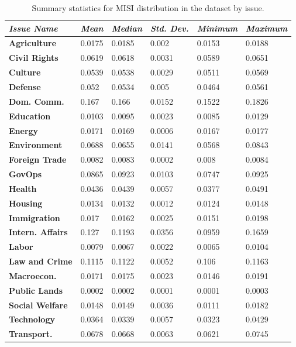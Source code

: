 \documentclass[11pt,a4paper]{article}
\begin{document}
\begin{table}
\centering
\caption{Summary statistics for MISI distribution in the dataset by issue. }
\label{tab:tab3}
\vspace{0.5cm}
\begin{tabular*}{\linewidth}{@{\extracolsep{\fill}} | l | l | l | l | l | l |}
\hline
\textit{Issue Name} & \textit{Mean} & \textit{Median} & \textit{Std. Dev.} & \textit{Minimum} & \textit{Maximum} \\
\hline
\textbf{Agriculture} & 0.0175 & 0.0185 & 0.002 & 0.0153 & 0.0188 \\
\hline
\textbf{Civil Rights} & 0.0619 & 0.0618 & 0.0031 & 0.0589 & 0.0651 \\
\hline
\textbf{Culture} & 0.0539 & 0.0538 & 0.0029 & 0.0511 & 0.0569 \\
\hline
\textbf{Defense} & 0.052 & 0.0534 & 0.005 & 0.0464 & 0.0561 \\
\hline
\textbf{Dom. Comm.} & 0.167 & 0.166 & 0.0152 & 0.1522 & 0.1826 \\
\hline
\textbf{Education} & 0.0103 & 0.0095 & 0.0023 & 0.0085 & 0.0129 \\
\hline
\textbf{Energy} & 0.0171 & 0.0169 & 0.0006 & 0.0167 & 0.0177 \\
\hline
\textbf{Environment} & 0.0688 & 0.0655 & 0.0141 & 0.0568 & 0.0843 \\
\hline
\textbf{Foreign Trade} & 0.0082 & 0.0083 & 0.0002 & 0.008 & 0.0084 \\
\hline
\textbf{GovOps} & 0.0865 & 0.0923 & 0.0103 & 0.0747 & 0.0925 \\
\hline
\textbf{Health} & 0.0436 & 0.0439 & 0.0057 & 0.0377 & 0.0491 \\
\hline
\textbf{Housing} & 0.0134 & 0.0132 & 0.0012 & 0.0124 & 0.0148 \\
\hline
\textbf{Immigration} & 0.017 & 0.0162 & 0.0025 & 0.0151 & 0.0198 \\
\hline
\textbf{Intern. Affairs} & 0.127 & 0.1193 & 0.0356 & 0.0959 & 0.1659 \\
\hline
\textbf{Labor} & 0.0079 & 0.0067 & 0.0022 & 0.0065 & 0.0104 \\
\hline
\textbf{Law and Crime} & 0.1115 & 0.1122 & 0.0052 & 0.106 & 0.1163 \\
\hline
\textbf{Macroecon.} & 0.0171 & 0.0175 & 0.0023 & 0.0146 & 0.0191 \\
\hline
\textbf{Public Lands} & 0.0002 & 0.0002 & 0.0001 & 0.0001 & 0.0003 \\
\hline
\textbf{Social Welfare} & 0.0148 & 0.0149 & 0.0036 & 0.0111 & 0.0182 \\
\hline
\textbf{Technology} & 0.0364 & 0.0339 & 0.0057 & 0.0323 & 0.0429 \\
\hline
\textbf{Transport.} & 0.0678 & 0.0668 & 0.0063 & 0.0621 & 0.0745 \\
\hline

\end{tabular*}

\end{table}
\end{document}
